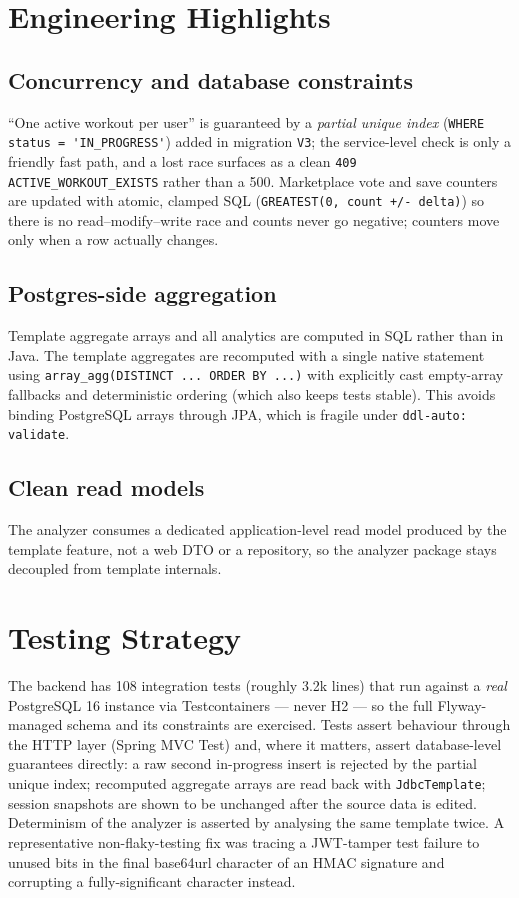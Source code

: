 \documentclass[11pt,a4paper]{article}
\begin{document}
\section{Engineering Highlights}

\subsection{Concurrency and database constraints}
\label{sec:concurrency}
``One active workout per user'' is guaranteed by a \emph{partial unique index}
(\verb|WHERE status = 'IN_PROGRESS'|) added in migration \verb|V3|; the service-level check is only
a friendly fast path, and a lost race surfaces as a clean \verb|409 ACTIVE_WORKOUT_EXISTS| rather
than a 500. Marketplace vote and save counters are updated with atomic, clamped SQL
(\verb|GREATEST(0, count +/- delta)|) so there is no read--modify--write race and counts never go
negative; counters move only when a row actually changes.

\subsection{Postgres-side aggregation}
Template aggregate arrays and all analytics are computed in SQL rather than in Java. The template
aggregates are recomputed with a single native statement using \verb|array_agg(DISTINCT ... ORDER BY ...)|
with explicitly cast empty-array fallbacks and deterministic ordering (which also keeps tests
stable). This avoids binding PostgreSQL arrays through JPA, which is fragile under
\verb|ddl-auto: validate|.

\subsection{Clean read models}
The analyzer consumes a dedicated application-level read model produced by the template feature,
not a web DTO or a repository, so the analyzer package stays decoupled from template internals.

\section{Testing Strategy}
The backend has 108 integration tests (roughly 3.2k lines) that run against a \emph{real}
PostgreSQL 16 instance via Testcontainers --- never H2 --- so the full Flyway-managed schema and its
constraints are exercised. Tests assert behaviour through the HTTP layer (Spring MVC Test) and, where
it matters, assert database-level guarantees directly: a raw second in-progress insert is rejected
by the partial unique index; recomputed aggregate arrays are read back with \verb|JdbcTemplate|;
session snapshots are shown to be unchanged after the source data is edited. Determinism of the
analyzer is asserted by analysing the same template twice. A representative non-flaky-testing fix
was tracing a JWT-tamper test failure to unused bits in the final base64url character of an HMAC
signature and corrupting a fully-significant character instead.
\end{document}
